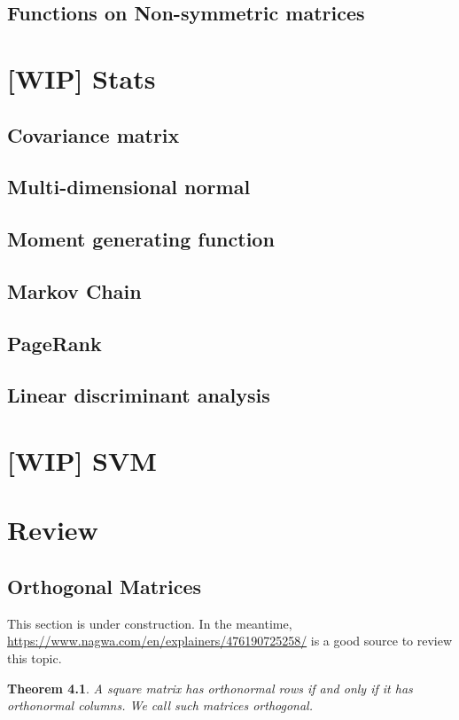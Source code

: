 \documentclass{amsbook}
\newtheorem{theorem}{Theorem}
\begin{document}
\section{Functions on Non-symmetric matrices}

\chapter{[WIP] Stats}
\section{Covariance matrix}\label{Section-Covariance}
\section{Multi-dimensional normal}
\section{Moment generating function}
\section{Markov Chain}
\section{PageRank}
\section{Linear discriminant analysis}

\chapter{[WIP] SVM}

\chapter{Review}

\section{Orthogonal Matrices}\label{OrthogonalMatrices}

This section is under construction.  In the meantime, \url{https://www.nagwa.com/en/explainers/476190725258/} is a good source to review this topic.

\begin{theorem}\label{OrthogonalMatrixDefinition}
A square matrix has orthonormal rows if and only if it has orthonormal columns.  We call such matrices {\em orthogonal}.
\end{theorem}
\end{document}
